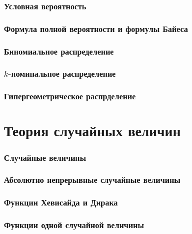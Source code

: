\section{Условная вероятность}

\section{Формула полной вероятности и формулы Байеса}

\section{Биномиальное распределение}

\section{$k$-номинальное распределение}

\section{Гипергеометрическое распрделение}

\part{Теория случайных величин}

\section{Случайные величины}

\section{Абсолютно непрерывные случайные величины}

\section{Функции Хевисайда и Дирака}

\section{Функции одной случайной величины}








